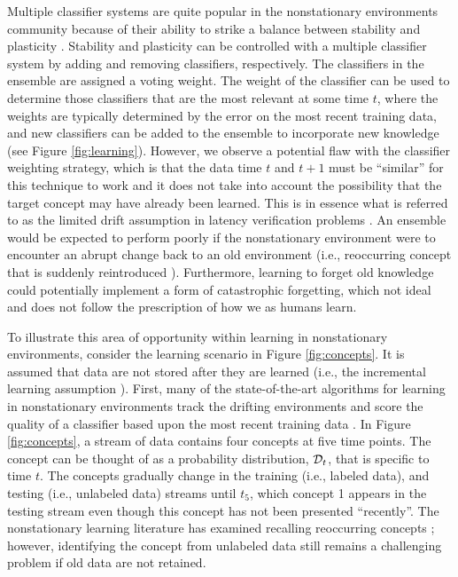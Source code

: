 \documentclass[10pt, conference]{IEEEtran}
\begin{document}
Multiple classifier systems are quite popular in the nonstationary environments community because of their ability to strike a balance between stability and plasticity \cite{Ditzler2013TKDE, Minku2012TKDE, Kuncheva2004MCS}. 
Stability and plasticity can be controlled with a multiple classifier system by adding and removing classifiers, respectively. The classifiers in the ensemble are assigned a  voting weight. 
The weight of the classifier can be used to determine those classifiers that are the most relevant at some time $t$, where the weights are typically determined by the error on the most recent training data, and new classifiers can be added to the ensemble to incorporate new knowledge (see Figure \ref{fig:learning}). However, we observe a potential flaw with the classifier weighting strategy, which is that the data time $t$ and $t+1$ must be ``similar'' for this technique to work and it does not take into account the possibility that the target concept may have already been learned. This is in essence what is referred to as the limited drift assumption in latency verification problems \cite{Souza2015ICDM, Dyer2014TNNLS, Sarnelle2015IJCNN}. 
An ensemble would be expected to perform poorly if the nonstationary environment were to encounter an abrupt change back to an old environment (i.e., reoccurring concept that is suddenly reintroduced \cite{Alippi2013TNNLS, Elwell2011TNN}). 
Furthermore, learning to forget old knowledge could potentially implement a form of catastrophic forgetting, which not ideal and does not follow the prescription of how we as humans learn. 

To illustrate this area of opportunity within learning in nonstationary environments, consider the learning scenario  in Figure \ref{fig:concepts}. It is assumed that data are not stored after  they are learned (i.e., the incremental learning assumption \cite{Bifet2009KDD, Polikar2001TSMC}). First, many of the state-of-the-art algorithms for learning in nonstationary environments track the drifting environments and score the quality of a classifier based upon the most recent training data \cite{Ditzler2013TKDE, Dyer2014TNNLS, Alippi2008TNNb, Bifet2009KDD, Nishida2007MLC}. 
In Figure \ref{fig:concepts}, a stream of data contains four concepts at five time points. The concept can be thought of as a probability distribution, ${\mathcal D}_t$, that is specific to time $t$. The concepts gradually change in the training (i.e., labeled data), and testing (i.e., unlabeled data) streams until $t_5$, which {concept 1} appears in the testing stream even though this concept has not been presented ``recently''.  
The nonstationary learning literature has examined recalling reoccurring concepts \cite{Alippi2013TNNLS}; however, identifying the concept from unlabeled data still remains a challenging problem if old data are not retained. 
\end{document}
